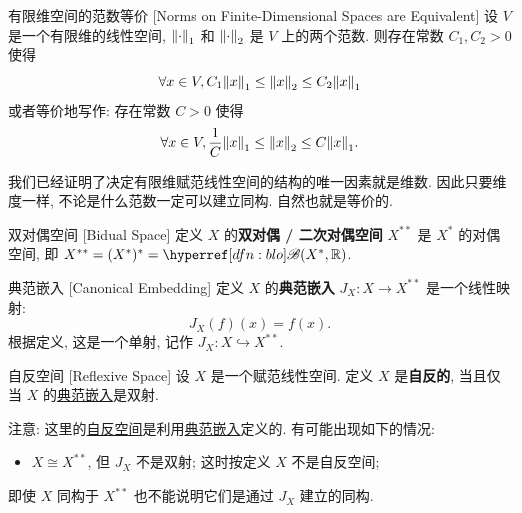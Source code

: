         \begin{thm}
            {有限维空间的范数等价}
            [Norms on Finite-Dimensional Spaces are Equivalent]
            设 \(V\) 是一个有限维的线性空间, \(\norm{\cdot}_1\) 和 \(\norm{\cdot}_2\) 是 \(V\) 上的两个范数. 则存在常数 \(C_1, C_2>0\) 使得
            \[\forall x\in V, C_1\norm{x}_1\leq\norm{x}_2\leq C_2\norm{x}_1\]
            或者等价地写作: 存在常数 \(C>0\) 使得
            \[\forall x\in V, \frac{1}{C}\norm{x}_1\leq\norm{x}_2\leq C\norm{x}_1.\]
        \end{thm}

        \begin{rmk}
            [Dedicatia]
            我们已经证明了决定有限维赋范线性空间的结构的唯一因素就是维数. 因此只要维度一样, 不论是什么范数一定可以建立同构. 自然也就是等价的.
        \end{rmk}

        \begin{dfn}
            {双对偶空间}
            [Bidual Space]
            定义 \(X\) 的\textbf{双对偶 / 二次对偶空间} \(X^{**}\) 是 \(X^*\) 的对偶空间, 即 \(X^{**}=(X^*)^*=\blo(X^*, \R)\).
        \end{dfn}

        \begin{dfn}
            {典范嵌入}
            [Canonical Embedding]
            定义 \(X\) 的\textbf{典范嵌入} \(J_X:X\to X^{**}\) 是一个线性映射:
            \[J_X(f)(x) = f(x).\]
            根据定义, 这是一个单射, 记作 \(J_X:X\hookrightarrow X^{**}\).
        \end{dfn}

        \begin{dfn}
            [reflexive]
            {自反空间}
            [Reflexive Space]
            设 \(X\) 是一个赋范线性空间. 定义 \(X\) 是\textbf{自反的}, 当且仅当 \(X\) 的\hyperref[dfn:canonical-embedding]{典范嵌入}是双射.
        \end{dfn}

        \begin{rmk}
            注意: 这里的\hyperref[dfn:reflexive]{自反空间}是利用\hyperref[dfn:canonical-embedding]{典范嵌入}定义的. 有可能出现如下的情况:
            \begin{itemize}
                \item \(X\cong X^{**}\), 但 \(J_X\) 不是双射; 这时按定义 \(X\) 不是自反空间;
            \end{itemize}
            即使 \(X\) 同构于 \(X^{**}\) 也不能说明它们是通过 \(J_X\) 建立的同构.
        \end{rmk}

